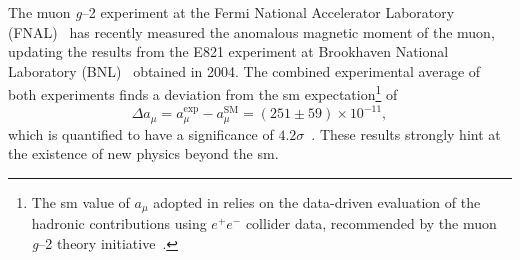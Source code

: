 The muon \textit{g}--2 experiment at the Fermi National Accelerator Laboratory (FNAL)~\cite{Abi:2021gix} has recently measured the anomalous magnetic moment of the muon, updating the results from the E821 experiment at Brookhaven National Laboratory (BNL)~\cite{Bennett:2006fi} obtained in 2004. The combined experimental average of both experiments finds a deviation from the \gls{sm} expectation\footnote{The \gls{sm} value of $a_\mu$ adopted in \cite{Abi:2021gix} relies on the data-driven evaluation of the hadronic contributions using $e^+e^-$ collider data, recommended by the muon \textit{g}--2 theory initiative~\cite{Aoyama:2020ynm}.} of
\begin{equation}
	\Delta a_\mu = a^\mathrm{exp}_\mu - a^\mathrm{SM}_\mu = (251\pm59)\times 10^{-11},
\end{equation}
which is quantified to have a significance of $4.2\sigma$~\cite{Abi:2021gix}. These results strongly hint at the existence of new physics beyond the \gls{sm}.

